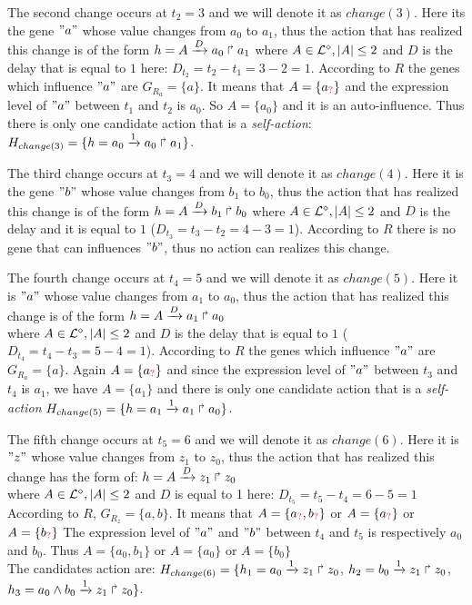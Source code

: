 The second change occurs at $t_2 = 3$ and we will denote it as $change(3)$.
Here its the gene $"a"$ whose value changes from $a_0$ to $a_1$, thus the action that has realized this change is of the form
$h = A\xrightarrow{D} a_0 \Rsh a_1$ 
where $ A \in \mathcal{L}^{\diamond}, | A| \leq 2$ and $D$ is the delay that is equal to $1$ here: 
$D_{t_2}= t_2 - t_1 = 3 - 2= 1$.
According to $R$ the genes which influence $"a"$ are $G_{R_a} = \{a\}$.
It means that $A= \{ a_{\textcolor{red}{?}}\}$ and the expression level of $"a"$ between $t_1$ and $t_{2}$ is $a_0$.
So  $A= \{ a_0\} $ and it is an auto-influence. Thus there is only one candidate action that is a \emph{self-action}:
$H_{change(3)} = \{ h=a_0\xrightarrow{1} a_0 \Rsh a_1  \}$.

The third change occurs at $t_3 = 4$ and we will denote it as $change(4)$.
Here it is the gene $"b"$ whose value changes from $b_1$ to $b_0$, thus the action that has realized this change is of the form 
$h = A\xrightarrow{D} b_1 \Rsh b_0$ where $ A \in \mathcal{L}^{\diamond}, | A| \leq 2$ and $D$ is the delay and it is equal to $1$ ($D_{t_3}= t_3 - t_2 = 4 - 3 = 1$).
According to $R$ there is no gene that can influences $"b"$, thus no action can realizes this change.

The fourth change occurs at $t_4 = 5$ and we will denote it as $change(5)$.
Here it is $"a"$ whose value changes from $a_1$ to $a_0$, thus the action that has realized this change is of the form $h = A\xrightarrow{D} a_1 \Rsh a_0$ \\
where $ A \in \mathcal{L}^{\diamond}, | A| \leq 2$ and $D$ is the delay that is equal to $1$ ($D_{t_4}= t_4 - t_3 = 5 - 4= 1$).
According to $R$ the genes which influence $"a"$ are $G_{R_a} = \{a\}$.
Again $A= \{ a_{\textcolor{red}{?}}\}$ and since the expression level of $"a"$ between $t_3$ and $t_{4}$ is $a_1$,
we have $A= \{ a_1\} $ and there is only one candidate action that is a \emph{self-action}
$H_{change(5)} = \{ h=a_1\xrightarrow{1} a_1 \Rsh a_0 \}$.

The fifth change occurs at $t_5 = 6$ and we will denote it as $change(6)$.
Here it is $"z"$ whose value changes from $z_1$ to $z_0$, thus the action that has realized this change has the form of:
$h = A\xrightarrow{D} z_1 \Rsh z_0$ \\
where $ A \in \mathcal{L}^{\diamond}, |A| \leq 2$ and $D$ is equal to 1 here:
$D_{t_5}= t_5 - t_4 = 6 - 5= 1$ \\
According to $R$, $G_{R_z} = \{a, b\}$.
It means that $A= \{ a_{\textcolor{red}{?}}, b_{\textcolor{red}{?}} \} $ or $A= \{ a_{\textcolor{red}{?}} \} $ or $A= \{ b_{\textcolor{red}{?}} \} $
The expression level of $"a"$ and $"b"$ between $t_4$ and $t_{5}$ is respectively $a_0$ and $b_0$.
Thus $A= \{ a_0, b_1 \} $ or $A= \{ a_0\} $ or $A= \{ b_0 \} $ \\
The candidates action are:
$H_{change(6)} = \{ h_1=a_0\xrightarrow{1} z_1 \Rsh z_0$, $  h_2=b_0\xrightarrow{1} z_1 \Rsh z_0$, $  h_3=a_0 \wedge b_0 \xrightarrow{1} z_1 \Rsh z_0 \}$.

